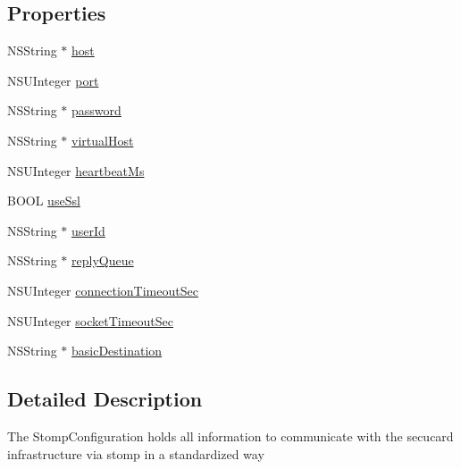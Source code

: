 \subsection*{Properties}
\begin{DoxyCompactItemize}
\item 
N\+S\+String $\ast$ \hyperlink{interface_s_c_stomp_configuration_a534749ad7eb52e5a66f404884eda6b53}{host}
\item 
N\+S\+U\+Integer \hyperlink{interface_s_c_stomp_configuration_a5232ff4f532f210a64de8e6cbdacd6eb}{port}
\item 
N\+S\+String $\ast$ \hyperlink{interface_s_c_stomp_configuration_aa868becdadbb872edbc70ca5d636475d}{password}
\item 
N\+S\+String $\ast$ \hyperlink{interface_s_c_stomp_configuration_ac56e7c704554c36ad37216643100753c}{virtual\+Host}
\item 
N\+S\+U\+Integer \hyperlink{interface_s_c_stomp_configuration_ae002e458d8e27fc4cd19e60256bc71bd}{heartbeat\+Ms}
\item 
B\+O\+OL \hyperlink{interface_s_c_stomp_configuration_a9a176c86f9a4744628408fd741ae6250}{use\+Ssl}
\item 
N\+S\+String $\ast$ \hyperlink{interface_s_c_stomp_configuration_a43d6136acb34f8926c17833000c7133e}{user\+Id}
\item 
N\+S\+String $\ast$ \hyperlink{interface_s_c_stomp_configuration_ae04db0c3fab164ace5d88bed0f2d8801}{reply\+Queue}
\item 
N\+S\+U\+Integer \hyperlink{interface_s_c_stomp_configuration_a0b3c3eb58edb936494019e43eef2f7b7}{connection\+Timeout\+Sec}
\item 
N\+S\+U\+Integer \hyperlink{interface_s_c_stomp_configuration_a3eb260255e207f5cc8f092dacc3aa16f}{socket\+Timeout\+Sec}
\item 
N\+S\+String $\ast$ \hyperlink{interface_s_c_stomp_configuration_a81aeeded88b8c1b3ce6cf8c02b749936}{basic\+Destination}
\end{DoxyCompactItemize}


\subsection{Detailed Description}
The Stomp\+Configuration holds all information to communicate with the secucard infrastructure via stomp in a standardized way 

